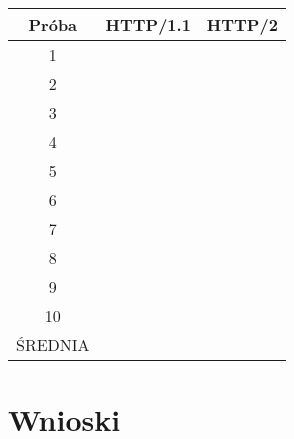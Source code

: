 \documentclass[a4paper,12pt,twoside,openany]{report}
\newcommand{\tech}{\texttt}
\begin{document}
\begin{tabular}{c|c|c}
Próba & HTTP/1.1 & HTTP/2 \\ \hline
1 & & \\
2 & & \\
3 & & \\
4 & & \\
5 & & \\
6 & & \\
7 & & \\
8 & & \\
9 & & \\
10 & & \\ \hline
ŚREDNIA & & \\
\end{tabular}


\chapter{Wnioski}


%
%

\end{document}
